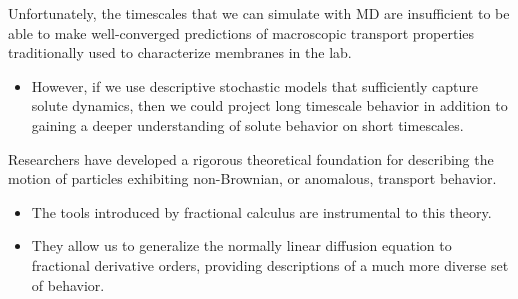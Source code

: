 \documentclass{article}
\begin{document}
  Unfortunately, the timescales that we can simulate with MD are insufficient to be
  able to make well-converged predictions of macroscopic transport properties 
  traditionally used to characterize membranes in the lab. \\
  \begin{itemize}
    \item However, if we use descriptive stochastic models that sufficiently capture solute
    dynamics, then we could project long timescale behavior in addition to gaining
    a deeper understanding of solute behavior on short timescales.
  \end{itemize}
  
  \noindent Researchers have developed a rigorous theoretical foundation for describing
  the motion of particles exhibiting non-Brownian, or anomalous, transport behavior.
  \begin{itemize}
    \item The tools introduced by fractional calculus are instrumental to this theory. 
    \item They allow us to generalize the normally linear diffusion equation to fractional
    derivative orders, providing descriptions of a much more diverse set of behavior. \cite{klages_anomalous_2008} %
  \end{itemize}
  
\end{document}
